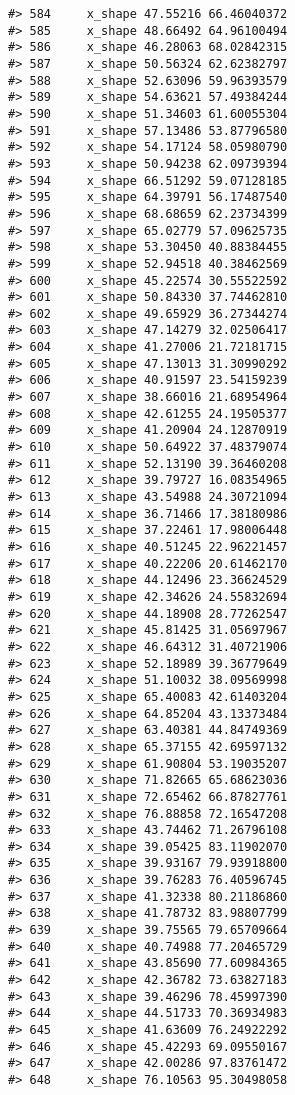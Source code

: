 \documentclass[
]{book}
\theoremstyle{definition}
\theoremstyle{definition}
\theoremstyle{definition}
\theoremstyle{definition}
\theoremstyle{remark}
\begin{document}
\begin{verbatim}
#> 584     x_shape 47.55216 66.46040372
#> 585     x_shape 48.66492 64.96100494
#> 586     x_shape 46.28063 68.02842315
#> 587     x_shape 50.56324 62.62382797
#> 588     x_shape 52.63096 59.96393579
#> 589     x_shape 54.63621 57.49384244
#> 590     x_shape 51.34603 61.60055304
#> 591     x_shape 57.13486 53.87796580
#> 592     x_shape 54.17124 58.05980790
#> 593     x_shape 50.94238 62.09739394
#> 594     x_shape 66.51292 59.07128185
#> 595     x_shape 64.39791 56.17487540
#> 596     x_shape 68.68659 62.23734399
#> 597     x_shape 65.02779 57.09625735
#> 598     x_shape 53.30450 40.88384455
#> 599     x_shape 52.94518 40.38462569
#> 600     x_shape 45.22574 30.55522592
#> 601     x_shape 50.84330 37.74462810
#> 602     x_shape 49.65929 36.27344274
#> 603     x_shape 47.14279 32.02506417
#> 604     x_shape 41.27006 21.72181715
#> 605     x_shape 47.13013 31.30990292
#> 606     x_shape 40.91597 23.54159239
#> 607     x_shape 38.66016 21.68954964
#> 608     x_shape 42.61255 24.19505377
#> 609     x_shape 41.20904 24.12870919
#> 610     x_shape 50.64922 37.48379074
#> 611     x_shape 52.13190 39.36460208
#> 612     x_shape 39.79727 16.08354965
#> 613     x_shape 43.54988 24.30721094
#> 614     x_shape 36.71466 17.38180986
#> 615     x_shape 37.22461 17.98006448
#> 616     x_shape 40.51245 22.96221457
#> 617     x_shape 40.22206 20.61462170
#> 618     x_shape 44.12496 23.36624529
#> 619     x_shape 42.34626 24.55832694
#> 620     x_shape 44.18908 28.77262547
#> 621     x_shape 45.81425 31.05697967
#> 622     x_shape 46.64312 31.40721906
#> 623     x_shape 52.18989 39.36779649
#> 624     x_shape 51.10032 38.09569998
#> 625     x_shape 65.40083 42.61403204
#> 626     x_shape 64.85204 43.13373484
#> 627     x_shape 63.40381 44.84749369
#> 628     x_shape 65.37155 42.69597132
#> 629     x_shape 61.90804 53.19035207
#> 630     x_shape 71.82665 65.68623036
#> 631     x_shape 72.65462 66.87827761
#> 632     x_shape 76.88858 72.16547208
#> 633     x_shape 43.74462 71.26796108
#> 634     x_shape 39.05425 83.11902070
#> 635     x_shape 39.93167 79.93918800
#> 636     x_shape 39.76283 76.40596745
#> 637     x_shape 41.32338 80.21186860
#> 638     x_shape 41.78732 83.98807799
#> 639     x_shape 39.75565 79.65709664
#> 640     x_shape 40.74988 77.20465729
#> 641     x_shape 43.85690 77.60984365
#> 642     x_shape 42.36782 73.63827183
#> 643     x_shape 39.46296 78.45997390
#> 644     x_shape 44.51733 70.36934983
#> 645     x_shape 41.63609 76.24922292
#> 646     x_shape 45.42293 69.09550167
#> 647     x_shape 42.00286 97.83761472
#> 648     x_shape 76.10563 95.30498058

\end{verbatim}
\end{document}
